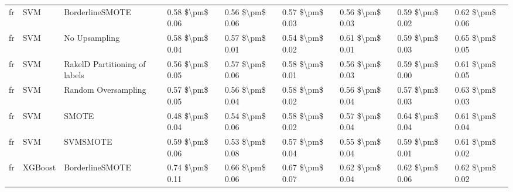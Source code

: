 \begin{tabular}{lllllllll}
      fr &                             SVM &               BorderlineSMOTE &     0.58 \$\textbackslash pm\$ 0.06 &           0.56 \$\textbackslash pm\$ 0.06 &       0.57 \$\textbackslash pm\$ 0.03 &        0.56 \$\textbackslash pm\$ 0.03 &                         0.59 \$\textbackslash pm\$ 0.02 &     0.62 \$\textbackslash pm\$ 0.06 \\
      fr &                             SVM &                 No Upsampling &     0.58 \$\textbackslash pm\$ 0.04 &           0.57 \$\textbackslash pm\$ 0.01 &       0.54 \$\textbackslash pm\$ 0.02 &        0.61 \$\textbackslash pm\$ 0.01 &                         0.59 \$\textbackslash pm\$ 0.03 &     0.65 \$\textbackslash pm\$ 0.05 \\
      fr &                             SVM & RakelD Partitioning of labels &     0.56 \$\textbackslash pm\$ 0.05 &           0.57 \$\textbackslash pm\$ 0.06 &       0.58 \$\textbackslash pm\$ 0.01 &        0.56 \$\textbackslash pm\$ 0.03 &                         0.59 \$\textbackslash pm\$ 0.00 &     0.61 \$\textbackslash pm\$ 0.05 \\
      fr &                             SVM &           Random Oversampling &     0.57 \$\textbackslash pm\$ 0.05 &           0.56 \$\textbackslash pm\$ 0.04 &       0.58 \$\textbackslash pm\$ 0.02 &        0.56 \$\textbackslash pm\$ 0.04 &                         0.57 \$\textbackslash pm\$ 0.03 &     0.63 \$\textbackslash pm\$ 0.03 \\
      fr &                             SVM &                         SMOTE &     0.48 \$\textbackslash pm\$ 0.04 &           0.54 \$\textbackslash pm\$ 0.06 &       0.58 \$\textbackslash pm\$ 0.02 &        0.57 \$\textbackslash pm\$ 0.04 &                         0.64 \$\textbackslash pm\$ 0.04 &     0.61 \$\textbackslash pm\$ 0.04 \\
      fr &                             SVM &                      SVMSMOTE &     0.59 \$\textbackslash pm\$ 0.06 &           0.53 \$\textbackslash pm\$ 0.08 &       0.57 \$\textbackslash pm\$ 0.04 &        0.55 \$\textbackslash pm\$ 0.04 &                         0.59 \$\textbackslash pm\$ 0.01 &     0.61 \$\textbackslash pm\$ 0.02 \\
      fr &                         XGBoost &               BorderlineSMOTE &     0.74 \$\textbackslash pm\$ 0.11 &           0.66 \$\textbackslash pm\$ 0.06 &       0.67 \$\textbackslash pm\$ 0.07 &        0.62 \$\textbackslash pm\$ 0.04 &                         0.62 \$\textbackslash pm\$ 0.06 &     0.62 \$\textbackslash pm\$ 0.02 \\

\end{tabular}

